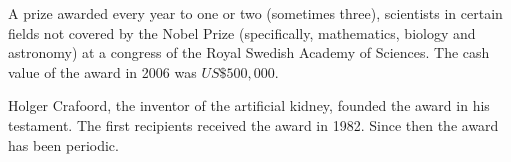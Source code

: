\documentclass[12pt]{article}
\begin{document}
A prize awarded every year to one or two (sometimes three), scientists in certain fields not covered by the Nobel Prize (specifically, mathematics, biology and astronomy) at a congress of the Royal Swedish Academy of Sciences. The cash value of the award in 2006 was $US\$500,000$.

Holger Crafoord, the inventor of the artificial kidney, founded the award in his testament. The first recipients received the award in 1982. Since then the award has been periodic.
\end{document}

